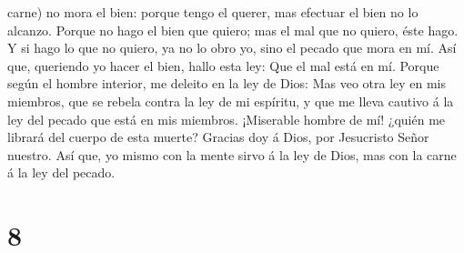 carne) no mora el bien: porque tengo el querer, mas efectuar el bien no
lo alcanzo.  Porque no hago el bien que quiero; mas el mal
que no quiero, éste hago.  Y si hago lo que no quiero, ya
no lo obro yo, sino el pecado que mora en mí.  Así que,
queriendo yo hacer el bien, hallo esta ley: Que el mal está en mí.
 Porque según el hombre interior, me deleito en la ley de
Dios:  Mas veo otra ley en mis miembros, que se rebela
contra la ley de mi espíritu, y que me lleva cautivo á la ley del pecado
que está en mis miembros.  ¡Miserable hombre de mí! ¿quién
me librará del cuerpo de esta muerte?  Gracias doy á Dios,
por Jesucristo Señor nuestro. Así que, yo mismo con la mente sirvo á la
ley de Dios, mas con la carne á la ley del pecado.

\hypertarget{section-7}{%
\section{8}\label{section-7}}


